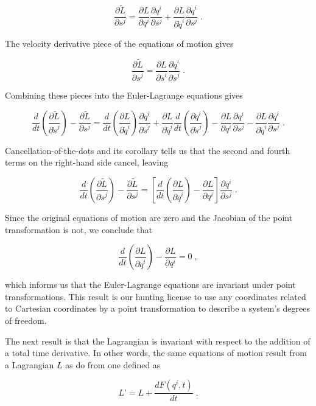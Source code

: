 \documentclass[12pt]{article}
\begin{document}
\[ \frac{\partial \tilde L}{\partial s^j} =    \frac{\partial L}{\partial q^i} \frac{\partial q^i}{\partial s^j} +  \frac{\partial L}{\partial {\dot q}^i} \frac{\partial {\dot q}^i}{\partial s^j} \; . \] 

The velocity derivative piece of the equations of motion gives

\[ \frac{\partial \tilde L}{\partial {\dot s}^j} = \frac{\partial L}{\partial {\dot s}^i} \frac{\partial {\dot q}^i}{\partial {\dot s}^j} \; . \]

Combining these pieces into the Euler-Lagrange equations gives

\[ \frac{d}{dt} \left( \frac{\partial \tilde L}{\partial {\dot s}^j } \right) - \frac{\partial \tilde L}{\partial s^j} = \frac{d}{d t} \left( \frac{\partial L}{\partial {\dot q}^i} \right) \frac{\partial {\dot q}^i}{\partial {\dot s}^j} + \frac{\partial L}{\partial {\dot q}^i} \frac{d}{dt} \left( \frac{\partial {\dot q}^i}{\partial {\dot s}^j} \right) - \frac{\partial L}{\partial q^i} \frac{\partial q^i}{\partial s^j} - \frac{\partial L}{\partial {\dot q}^i} \frac{\partial {\dot q}^i}{\partial s^j} \; .\] 
 
Cancellation-of-the-dots and its corollary tells us that the second and fourth terms on the right-hand side cancel, leaving

\[ \frac{d}{dt} \left( \frac{\partial \tilde L}{\partial {\dot s}^j } \right) - \frac{\partial \tilde L}{\partial s^j} = \left[ \frac{d}{d t} \left( \frac{\partial L}{\partial {\dot q}^i} \right) - \frac{\partial L}{\partial q^i} \right]   \frac{\partial q^i}{\partial s^j} \; . \] 

Since the original equations of motion are zero and the Jacobian of the point transformation is not, we conclude that 

\[  \frac{d}{d t} \left( \frac{\partial L}{\partial {\dot q}^i} \right) - \frac{\partial L}{\partial q^i} = 0 \; , \]

which informs us that the Euler-Lagrange equations are invariant under point transformations.  This result is our hunting license to use any coordinates related to Cartesian coordinates by a point transformation to describe a system's degrees of freedom.
   
The next result is that the Lagrangian is invariant with respect to the addition of a total time derivative.  In other words, the same equations of motion result from a Lagrangian $L$ as do from one defined as

\[ L’ = L + \frac{d F(q^i,t)}{dt} \; .\]
\end{document}

